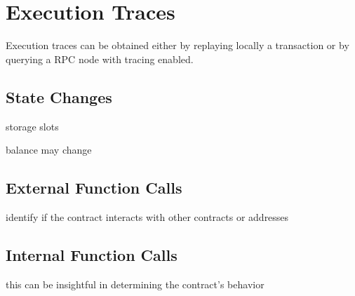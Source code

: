 \section{Execution Traces} \label{sec:dynamic-traces}

Execution traces can be obtained either by replaying locally a transaction or by querying a RPC node with tracing enabled.

\subsection{State Changes}

storage slots

balance may change

\subsection{External Function Calls}

identify if the contract interacts with other contracts or addresses

\subsection{Internal Function Calls}

this can be insightful in determining the contract's behavior